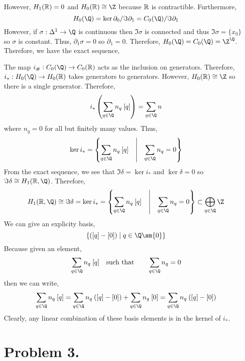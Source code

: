 \documentclass[12pt]{extarticle}
\begin{document}
\begin{center}
\end{center} 
However, $H_1(\mathbb{R}) = 0$ and $H_0(\R) \cong \Z$ because $\mathbb{R}$ is contractible. Furthermore,
\[ H_0(\Q) = \ker{\partial_0} / \Im{\partial_1} = C_0(\Q) / \Im{\partial_1} \]
However, if $\sigma : \Delta^1 \to \Q$ is continuous then $\Im{\sigma}$ is connected and thus $\Im{\sigma} = \{x_0\}$ so $\sigma$ is constant. Thus, $\partial_1 \sigma = 0$ so $\partial_1 = 0$. Therefore, $H_0(\Q) = C_0(\Q) = \Z^{\Q}$. Therefore, we have the exact sequence,
\begin{center}
\end{center}
The map $i_{\#} : C_0(\Q) \to C_0(\R)$ acts as the inclusion on generators. Therefore, $i_{*} : H_0(\Q) \to H_0(\R)$ takes generators to generators. However, $H_0(\R) \cong \Z$ so there is a single generator. Therefore, 
\[ i_* \left( \sum_{q \in \Q} n_q \: [q] \right) = \sum_{q \in \Q} n \]
where $n_q = 0$ for all but finitely many values. Thus,
\[ \ker{i_*} = \left\{ \sum_{q \in \Q} n_q \: [q] \quad \middle| \quad \sum_{q \in \Q} n_q = 0  \right\} \]
From the exact sequence, we see that $\Im{\delta} = \ker{i_*}$ and $\ker{\delta} = 0$ so $\Im{\delta} \cong H_1(\R, \Q)$.
Therefore,
\[ H_1(\R, \Q) \cong \Im{\delta} = \ker{i_*} = \left\{ \sum_{q \in \Q} n_q \: [q] \quad \middle| \quad \sum_{q \in \Q} n_q = 0  \right\}  \subset \bigoplus_{q \in \Q} \Z \]
We can give an explicity basis,
\[ \{ ([q] - [0]) \mid q \in \Q \sm \{0\} \} \]
Because given an element,
\[ \sum_{q \in \Q} n_q \: [q] \quad \text{such that} \quad \quad \sum_{q \in \Q} n_q = 0\]
then we can write,
\[ \sum_{q \in \Q} n_q \: [q] = \sum_{q \in \Q} n_q \: ([q] - [0]) +  \sum_{q \in \Q} n_q \: [0] = \sum_{q \in \Q} n_q \: ([q] - [0]) \]
Clearly, any linear combination of these basis elements is in the kernel of $i_*$. 

\section*{Problem 3.}
\end{document}
